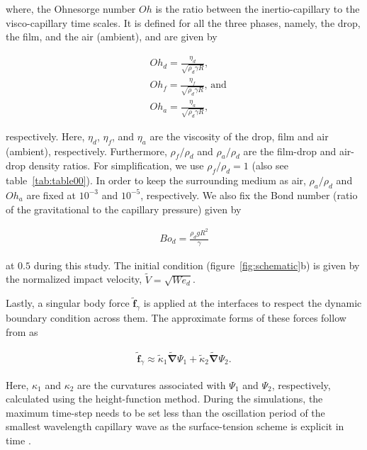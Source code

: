 \documentclass[]{jfm}
\newcommand{\Wen}{\mathit{We}_\mathit{d}}
\newcommand{\Bon}{\mathit{Bo}_\mathit{d}}
\begin{document}
	\noindent where, the Ohnesorge number $Oh$ is the ratio between the inertio-capillary to the visco-capillary time scales. It is defined for all the three phases, namely, the drop, the film, and the air (ambient), and are given by
	
	\begin{align}
		&Oh_d = \frac{\eta_d}{\sqrt{\rho_d\gamma R}},\\
		&Oh_f = \frac{\eta_f}{\sqrt{\rho_d\gamma R}},\,\text{and}\\
		&Oh_a = \frac{\eta_a}{\sqrt{\rho_d\gamma R}},
	\end{align}
	
	\noindent respectively. Here, $\eta_d$, $\eta_f$, and $\eta_a$ are the viscosity of the drop, film and air (ambient), respectively. Furthermore, $\rho_f/\rho_d$ and $\rho_a/\rho_d$ are the film-drop and air-drop density ratios. For simplification, we use $\rho_f/\rho_d = 1$ (also see table~\ref{tab:table00}). In order to keep the surrounding medium as air, $\rho_a/\rho_d$ and $Oh_a$ are fixed at $10^{-3}$ and $10^{-5}$, respectively. We also fix the Bond number (ratio of the gravitational to the capillary pressure) given by
	
	\begin{align}
		\Bon = \frac{\rho_dgR^2}{\gamma}
	\end{align}
	
	\noindent at $0.5$ during this study. The initial condition (figure~\ref{fig:schematic}b) is given by the normalized impact velocity, $\tilde{V} = \sqrt{\Wen}$. 
	
	Lastly, a singular body force $\boldsymbol{\tilde{f}}_\gamma$ is applied at the interfaces to respect the dynamic boundary condition across them. The approximate forms of these forces follow from \citet{brackbill1992continuum, prosperetti2009computational, tryggvason2011direct} as
	
	\begin{align}\label{Eqn::SurfaceTension}
		\boldsymbol{\tilde{f}}_\gamma \approx  \tilde{\kappa}_1\boldsymbol{\tilde{\nabla}}\Psi_1 +  \tilde{\kappa}_2\boldsymbol{\tilde{\nabla}}\Psi_2.
	\end{align}
	
	\noindent Here, $\kappa_1$ and $\kappa_2$ are the curvatures associated with $\Psi_1$ and $\Psi_2$, respectively, calculated using the height-function method.  During the simulations, the maximum time-step needs to be set less than the oscillation period of the smallest wavelength capillary wave as the surface-tension scheme is explicit in time \citep{popinet2009accurate, basiliskPopinet2}.
	
\end{document}
